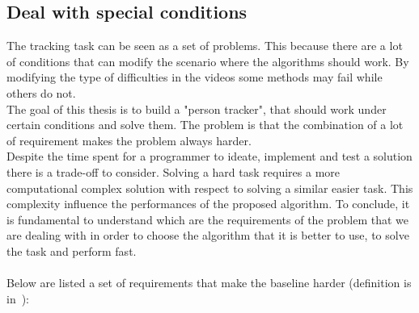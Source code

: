 \subsection{Deal with special conditions}\label{sec:tracking-conditions}
The tracking task can be seen as a set of problems. This because there are a lot of conditions that can modify the scenario where the algorithms should work. By modifying the type of difficulties in the videos some methods may fail while others do not.\\
The goal of this thesis is to build a "person tracker", that should work under certain conditions and solve them. The problem is that the combination of a lot of requirement makes the problem always harder.\\
Despite the time spent for a programmer to ideate, implement and test a solution there is a trade-off to consider. Solving a hard task requires a more computational complex solution with respect to solving a similar easier task. This complexity influence the performances of the proposed algorithm. To conclude, it is fundamental to understand which are the requirements of the problem that we are dealing with in order to choose the algorithm that it is better to use, to solve the task and perform fast.\\
\\
Below are listed a set of requirements that make the baseline harder (definition is in~):
